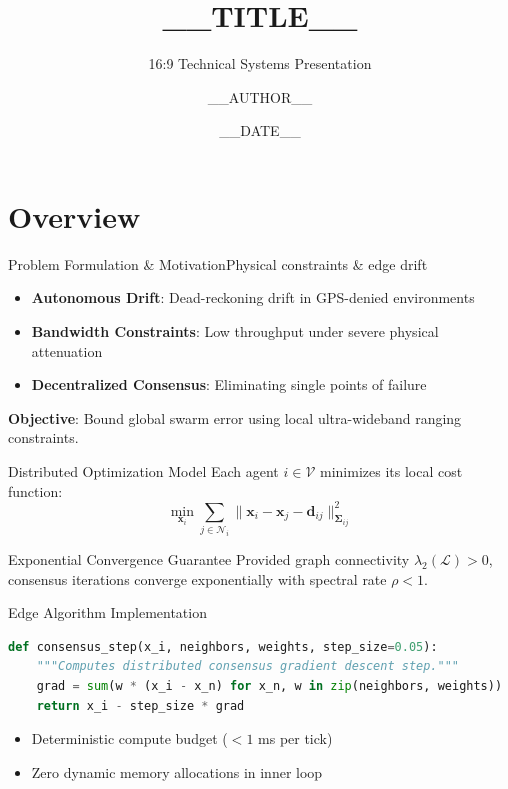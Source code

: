 \documentclass[aspectratio=169, 11pt]{beamer}
\title{\textbf{__TITLE__}}
\subtitle{16:9 Technical Systems Presentation}
\author{__AUTHOR__}
\institute{__DEPENDENCY__}
\date{__DATE__}
\begin{document}
\begin{frame}[plain]
    \titlepage
\end{frame}

\section{Overview}

\begin{frame}{Problem Formulation \& Motivation}{Physical constraints \& edge drift}
    \begin{itemize}
        \setlength{\itemsep}{0.8em}
        \item \textbf{Autonomous Drift}: Dead-reckoning drift in GPS-denied environments
        \item \textbf{Bandwidth Constraints}: Low throughput under severe physical attenuation
        \item \textbf{Decentralized Consensus}: Eliminating single points of failure
    \end{itemize}
    
    \vspace{0.8em}
    \begin{keynotecard}
        \textbf{Objective}: Bound global swarm error using local ultra-wideband ranging constraints.
    \end{keynotecard}
\end{frame}

\begin{frame}{Distributed Optimization Model}
    Each agent $i \in \mathcal{V}$ minimizes its local cost function:
    \begin{equation}
        \min_{\mathbf{x}_i} \sum_{j \in \mathcal{N}_i} \|\mathbf{x}_i - \mathbf{x}_j - \mathbf{d}_{ij}\|_{\mathbf{\Sigma}_{ij}}^2
    \end{equation}

    \begin{block}{Exponential Convergence Guarantee}
        Provided graph connectivity $\lambda_2(\mathcal{L}) > 0$, consensus iterations converge exponentially with spectral rate $\rho < 1$.
    \end{block}
\end{frame}

\begin{frame}[fragile]{Edge Algorithm Implementation}
\begin{lstlisting}[language=Python]
def consensus_step(x_i, neighbors, weights, step_size=0.05):
    """Computes distributed consensus gradient descent step."""
    grad = sum(w * (x_i - x_n) for x_n, w in zip(neighbors, weights))
    return x_i - step_size * grad
\end{lstlisting}

    \begin{itemize}
        \setlength{\itemsep}{0.6em}
        \item Deterministic compute budget ($< 1$ ms per tick)
        \item Zero dynamic memory allocations in inner loop
    \end{itemize}
\end{frame}
\end{document}

